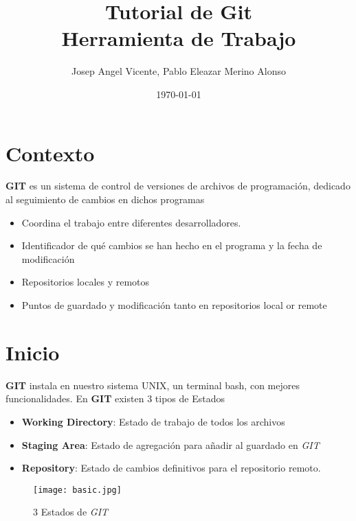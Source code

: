 \documentclass[letterpaper,12pt]{article}
\begin{document}
\title{\Huge{\textbf{Tutorial de Git}} \\ Herramienta de Trabajo}
\author{Josep Angel Vicente, Pablo Eleazar Merino Alonso}
\date{\today}
\maketitle
\section{Contexto}
\textbf{GIT} es un sistema de control de versiones de archivos de programación, dedicado al seguimiento de cambios en dichos programas
\begin{itemize}
\item  Coordina el trabajo entre diferentes desarrolladores.
\item Identificador de qué cambios se han hecho en el programa y la fecha de modificación
\item Repositorios locales y remotos
\item Puntos de guardado y modificación tanto en repositorios local or remote
\end{itemize}

\section{Inicio}
\textbf{GIT} instala en nuestro sistema UNIX, un terminal bash, con mejores funcionalidades. En \textbf{GIT} existen 3 tipos de Estados
\begin{itemize}
\item \textbf{Working Directory}: Estado de trabajo de todos los archivos
\item \textbf{Staging Area}: Estado de agregación para añadir al guardado en \textit{GIT}
\item \textbf{Repository}: Estado de cambios definitivos para el repositorio remoto.
\end{itemize}
\begin{figure}[!b]
	\centering
  \texttt{[image: basic.jpg]}
  \caption{3 Estados de \textit{GIT}}
  \label{fig:basic}
\end{figure}
\end{document}
